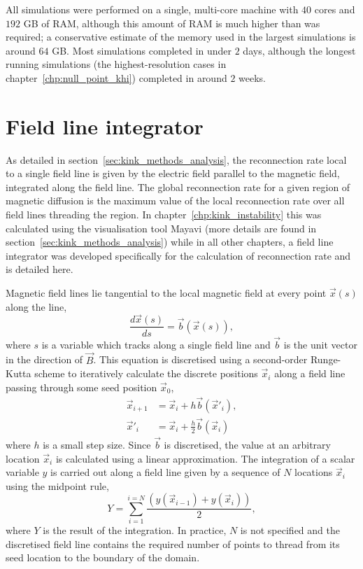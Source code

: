 All simulations were performed on a single, multi-core machine with $40$ cores and $192$ GB of RAM, although this amount of RAM is much higher than was required; a conservative estimate of the memory used in the largest simulations is around $64$ GB. Most simulations completed in under $2$ days, although the longest running simulations (the highest-resolution cases in chapter~\ref{chp:null_point_khi}) completed in around $2$ weeks. 

\section{Field line integrator}

As detailed in section~\ref{sec:kink_methods_analysis}, the reconnection rate local to a single field line is given by the electric field parallel to the magnetic field, integrated along the field line. The global reconnection rate for a given region of magnetic diffusion is the maximum value of the local reconnection rate over all field lines threading the region. In chapter~\ref{chp:kink_instability} this was calculated using the visualisation tool Mayavi (more details are found in section~\ref{sec:kink_methods_analysis}) while in all other chapters, a field line integrator was developed specifically for the calculation of reconnection rate and is detailed here.

Magnetic field lines lie tangential to the local magnetic field at every point $\vec{x}(s)$ along the line,
\begin{equation}
  \label{eq:field_line_equation}
  \frac{d\vec{x}(s)}{ds} = \vec{b}(\vec{x}(s)),
\end{equation}
where $s$ is a variable which tracks along a single field line and $\vec{b}$ is the unit vector in the direction of $\vec{B}$. This equation is discretised using a second-order Runge-Kutta scheme to iteratively calculate the discrete positions $\vec{x}_i$ along a field line passing through some seed position $\vec{x}_0$,
\begin{align}
  \label{eq:field_line_calculation}
  \vec{x}_{i+1} &= \vec{x}_i + h\vec{b}(\vec{x}'_i),\\
  \vec{x}'_i &= \vec{x}_i + \tfrac{h}{2}\vec{b}(\vec{x}_i)
\end{align}
where $h$ is a small step size. Since $\vec{b}$ is discretised, the value at an arbitrary location $\vec{x}_i$ is calculated using a linear approximation. The integration of a scalar variable $y$ is carried out along a field line given by a sequence of $N$ locations $\vec{x}_i$ using the midpoint rule,
\begin{equation}
  \label{eq:midpoint_rule}
  Y = \sum_{i=1}^{i=N} \frac{(y(\vec{x}_{i-1}) + y(\vec{x}_{i}))}{2},
\end{equation}
where $Y$ is the result of the integration. In practice, $N$ is not specified and the discretised field line contains the required number of points to thread from its seed location to the boundary of the domain.

